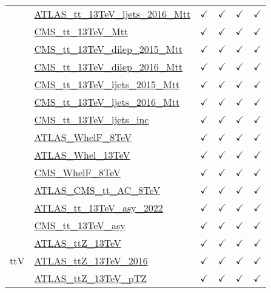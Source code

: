 \documentclass{article}
\begin{document}
\begin{longtable}{|c|l|c|c|c|c|}
 & \href{https://arxiv.org}{ATLAS_tt_13TeV_ljets_2016_Mtt}  & $\checkmark$ & $\checkmark$ & $\checkmark$ & $\checkmark$\\ \cline{2-6}
 & \href{https://arxiv.org}{CMS_tt_13TeV_Mtt}  & $\checkmark$ & $\checkmark$ & $\checkmark$ & $\checkmark$\\ \cline{2-6}
 & \href{https://arxiv.org}{CMS_tt_13TeV_dilep_2015_Mtt}  & $\checkmark$ & $\checkmark$ & $\checkmark$ & $\checkmark$\\ \cline{2-6}
 & \href{https://arxiv.org}{CMS_tt_13TeV_dilep_2016_Mtt}  & $\checkmark$ & $\checkmark$ & $\checkmark$ & $\checkmark$\\ \cline{2-6}
 & \href{https://arxiv.org}{CMS_tt_13TeV_ljets_2015_Mtt}  & $\checkmark$ & $\checkmark$ & $\checkmark$ & $\checkmark$\\ \cline{2-6}
 & \href{https://arxiv.org}{CMS_tt_13TeV_ljets_2016_Mtt}  & $\checkmark$ & $\checkmark$ & $\checkmark$ & $\checkmark$\\ \cline{2-6}
 & \href{https://arxiv.org}{CMS_tt_13TeV_ljets_inc}  & $\checkmark$ & $\checkmark$ & $\checkmark$ & $\checkmark$\\ \cline{2-6}
 & \href{https://arxiv.org}{ATLAS_WhelF_8TeV}  & $\checkmark$ & $\checkmark$ & $\checkmark$ & $\checkmark$\\ \cline{2-6}
 & \href{https://arxiv.org}{ATLAS_Whel_13TeV}  & $\checkmark$ & $\checkmark$ & $\checkmark$ & $\checkmark$\\ \cline{2-6}
 & \href{https://arxiv.org}{CMS_WhelF_8TeV}  & $\checkmark$ & $\checkmark$ & $\checkmark$ & $\checkmark$\\ \cline{2-6}
 & \href{https://arxiv.org}{ATLAS_CMS_tt_AC_8TeV}  & $\checkmark$ & $\checkmark$ & $\checkmark$ & $\checkmark$\\ \cline{2-6}
 & \href{https://arxiv.org}{ATLAS_tt_13TeV_asy_2022}  & $\checkmark$ & $\checkmark$ & $\checkmark$ & $\checkmark$\\ \cline{2-6}
 & \href{https://arxiv.org}{CMS_tt_13TeV_asy}  & $\checkmark$ & $\checkmark$ & $\checkmark$ & $\checkmark$
\\ \hline
\multirow{12}{*}{ttV}
 & \href{https://arxiv.org}{ATLAS_ttZ_13TeV}  & $\checkmark$ & $\checkmark$ & $\checkmark$ & $\checkmark$\\ \cline{2-6}
 & \href{https://arxiv.org}{ATLAS_ttZ_13TeV_2016}  & $\checkmark$ & $\checkmark$ & $\checkmark$ & $\checkmark$\\ \cline{2-6}
 & \href{https://arxiv.org}{ATLAS_ttZ_13TeV_pTZ}  & $\checkmark$ & $\checkmark$ & $\checkmark$ & $\checkmark$\\ \cline{2-6}

\end{longtable}
\end{document}
